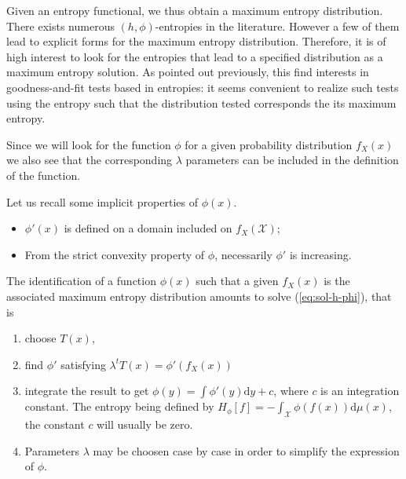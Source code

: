 \documentclass[english,onecolumn]{elsarticle}
\def\d{\mathrm{d}}
\def\dmu{\mathrm{d}\mu}
\def\X{\mathcal{X}}
\begin{document}
Given  an entropy  functional, we  thus obtain  a maximum  entropy distribution.
There exists numerous  $(h,\phi)$-entropies in the literature. However  a few of
them lead to explicit forms for the maximum entropy distribution.  Therefore, it
is  of  high interest  to  look  for the  entropies  that  lead  to a  specified
distribution as a maximum entropy solution. As pointed out previously, this find
interests in goodness-and-fit  tests based in entropies: it  seems convenient to
realize  such  tests  using  the  entropy  such  that  the  distribution  tested
corresponds the its maximum entropy.

Since we will look for the  function $\phi$ for a given probability distribution
$f_X(x)$ we also see that the corresponding $\lambda$ parameters can be included
in the definition of the function.


Let us recall some implicit properties of $\phi(x).$
%
\begin{itemize}
\item $\phi'(x)$ is defined on a domain included on $f_X(\X)$;
%
\item  From the  strict convexity  property  of $\phi$,  necessarily $\phi'$  is
  increasing.
\end{itemize}
%
The identification  of a function  $\phi(x)$ such that  a given $f_X(x)$  is the
associated maximum  entropy distribution amounts  to solve (\ref{eq:sol-h-phi}),
that is
%
\begin{enumerate}
\item choose $T(x)$,
%
\item find $\phi'$ satisfying $\lambda^t T(x) = \phi'(f_X(x))$
%
\item integrate the result to get  $\displaystyle \phi(y) = \int \phi'(y) \d y +
  c$,  where $c$  is  an integration  constant.   The entropy  being defined  by
  $\displaystyle H_\phi[f]  = - \int_{\X} \phi(f(x)) \dmu(x)$,  the constant $c$
  will usually be zero.
% 
\item Parameters $\lambda$ may be choosen  case by case in order to simplify the
  expression of $\phi.$
\end{enumerate}
\end{document}
